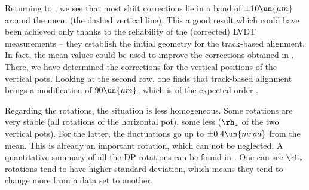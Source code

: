 Returning to , we see that most shift corrections lie in a band of $\pm 10\un{\mu m}$ around the mean (the dashed vertical line). This a good result which could have been achieved only thanks to the reliability of the (corrected) LVDT measurements -- they establish the initial geometry for the track-based alignment. In fact, the mean values could be used to improve the corrections obtained in . There, we have determined the corrections for the vertical positions of the vertical pots. Looking at the second row, one finds that track-based alignment brings a modification of $90\un{\mu m}$, which is of the expected order .

Regarding the rotations, the situation is less homogeneous. Some rotations are very stable (all rotations of the horizontal pot), some less ($\rh_z$ of the two vertical pots). For the latter, the fluctuations go up to $\pm 0.4\un{mrad}$ from the mean. This is already an important rotation, which can not be neglected. A quantitative summary of all the DP rotations can be found in . One can see $\rh_z$ rotations tend to have higher standard deviation, which means they tend to change more from a data set to another.


